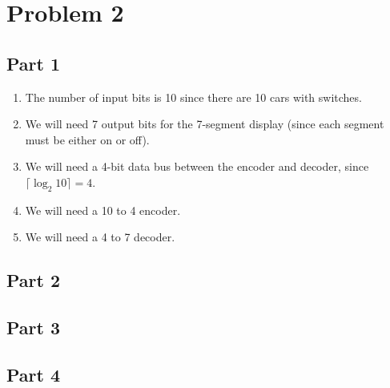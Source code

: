 \documentclass{article}
\begin{document}
\newpage
\section{Problem 2}

\subsection{Part 1}
\begin{enumerate}[label=\alph*.]
    \item The number of input bits is 10 since there are 10 cars with switches.
    \item We will need 7 output bits for the 7-segment display (since each segment must be either on or off).
    \item We will need a 4-bit data bus between the encoder and decoder, since $\lceil \log_2 10 \rceil = 4$.
    \item We will need a 10 to 4 encoder.
    \item We will need a 4 to 7 decoder.
\end{enumerate}

\subsection{Part 2}

\subsection{Part 3}

\subsection{Part 4}
\end{document}

